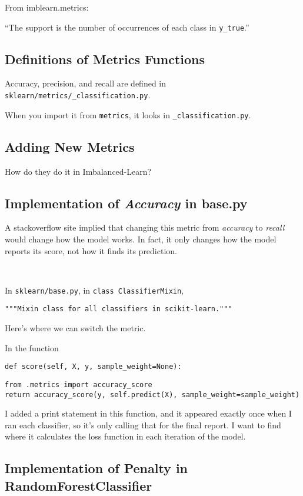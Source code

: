 \documentclass[11pt]{article}
\begin{document}
\begin{spacing}{1.2}
From imblearn.metrics:

``The support is the number of occurrences of each class in \verb|y_true|.''

\subsection{Definitions of Metrics Functions}

Accuracy, precision, and recall are defined in \verb|sklearn/metrics/_classification.py|.

When you import it from \verb|metrics|, it looks in \verb|_classification.py|.

\subsection{Adding New Metrics}

How do they do it in Imbalanced-Learn?

\subsection{Implementation of {\it Accuracy} in base.py}

A stackoverflow site implied that changing this metric from {\it accuracy} to {\it recall} would change how the model works.  In fact, it only changes how the model reports its score, not how it finds its prediction.  

\

In \verb|sklearn/base.py|, in \verb|class ClassifierMixin|, 

\verb|"""Mixin class for all classifiers in scikit-learn."""|

Here's where we can switch the metric.

In the function 

\verb|def score(self, X, y, sample_weight=None):|

\begin{verbatim}
from .metrics import accuracy_score
return accuracy_score(y, self.predict(X), sample_weight=sample_weight)
\end{verbatim}

I added a print statement in this function, and it appeared exactly once when I ran each classifier, so it's only calling that for the final report.  I want to find where it calculates the loss function in each iteration of the model.  

\subsection{Implementation of Penalty in RandomForestClassifier}


\end{spacing}
\end{document}
